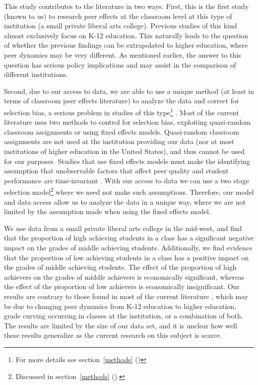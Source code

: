 \documentclass[12pt,letterpaper,english,fleqn]{article}
\newcommand{\sectlabel}[1]{section~\ref{#1} (\nameref{#1})}
\begin{document}
This study contributes to the literature in two ways.
First, this is the first study (known to us) to research peer effects at the classroom level at this type of institution (a small private liberal arts college). 
Previous studies of this kind  almost exclusively focus on K-12 education. 
This naturally leads to the question of whether the previous findings can be extrapolated to higher education, where peer dynamics may be very different. 
As mentioned earlier, the answer to this question has serious policy implications and may assist in the comparison of different institutions.

Second, due to our access to data, we are able to use a unique method (at least in terms of classroom peer effects literature) to analyze the data and correct for selection bias, a serious problem in studies of this type\footnote{For more details see \sectlabel{methods}} \citep{carman2012classroom,burke2013classroom,ding2007peers}. 
Most of the current literature uses two methods to control for selection bias, exploiting quasi-random classroom assignments or using fixed effects models.
Quasi-random classroom assignments are not used at the institution providing our data (nor at most institutions of higher education in the United States), and thus cannot be used for our purposes. 
Studies that use fixed effects models must make the identifying assumption that unobservable factors that affect peer quality and student performance are time-invariant \citep{lavy2012good}. 
With our access to data we can use a two stage selection model\footnote{Discussed in \sectlabel{methods}.} where we need not make such assumptions. 
Therefore, our model and data access allow us to analyze the data in a unique way, where we are not limited by the assumption made when using the fixed effects model.

We use data from a small private liberal arts college in the mid-west, and find that the proportion of high achieving students in a class has a significant negative impact on the grades of middle achieving students. 
Additionally, we find evidence that the proportion of low achieving students in a class has a positive impact on the grades of middle achieving students. 
The effect of the proportion of high achievers on the grades of middle achievers is economically significant, whereas the effect of the proportion of low achievers is economically insignificant. 
Our results are contrary to those found in most of the current literature \citep{kang2007classroom,carman2012classroom,burke2013classroom,schlosser2008inside,lavy2012good}, which may be due to changing peer dynamics from K-12 education to higher education, grade curving occurring in classes at the institution, or a combination of both.
The results are limited by the size of our data set, and it is unclear how well these results generalize as the current research on this subject is scarce. 
\end{document}
